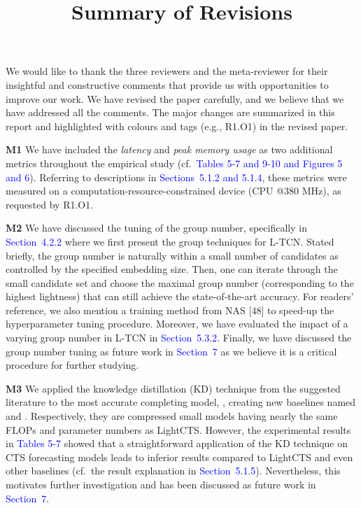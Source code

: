 \documentclass[sigconf,screen,anonymous=false]{acmart}
\newcommand{\LightCTS}{\mbox{LightCTS}}
\newcommand{\where}[1]{{\textcolor{blue}{#1}}}
\begin{document}
\pagestyle{plain}


\title{Summary of Revisions}
\maketitle

We would like to thank the three reviewers and the meta-reviewer for their insightful and constructive comments that provide us with opportunities to improve our work. We have revised the paper carefully, and we believe that we have addressed all the comments. The major changes are summarized in this report and highlighted with colours and tags (e.g., R1.O1) in the revised paper. 

\noindent
\textbf{M1}
\label{M1}
We have included the \emph{latency} and \emph{peak memory usage} as two additional metrics throughout the empirical study (cf.\ \where{Tables 5-7 and 9-10 and Figures 5 and 6}).
Referring to descriptions in \where{Sections~5.1.2 and 5.1.4}, these metrics were measured on a computation-resource-constrained device (CPU @380 MHz), as requested by R1.O1.



\noindent
\textbf{M2}
\label{M2}
We have discussed the tuning of the group number, specifically in \where{Section~4.2.2} where we first present the group techniques for L-TCN.
Stated briefly, the group number is naturally within a small number of candidates as controlled by the specified embedding size.
Then, one can iterate through the small candidate set and choose the maximal group number (corresponding to the highest lightness) that can still achieve the state-of-the-art accuracy.
For readers' reference, we also mention a training method from NAS [48] to speed-up the hyperparameter tuning procedure.
Moreover, we have evaluated the impact of a varying group number in L-TCN in \where{Section~5.3.2}.
Finally, we have discussed the group number tuning as future work in \where{Section~7} as we believe it is a critical procedure for further studying.





\noindent
\textbf{M3} 
\label{M3}
We applied the knowledge distillation (KD) technique from the suggested literature to the most accurate completing model, \AutoCTS{}, creating new baselines named \AutoCTSKDF{} and \AutoCTSKDP{}.
Respectively, they are compressed small models having nearly the same FLOPs and parameter numbers as \LightCTS{}.
However, the experimental results in \where{Tables 5-7} showed that a straightforward application of the KD technique on CTS forecasting models leads to inferior results compared to \LightCTS{} and even other baselines (cf.\ the result explanation in \where{Section~5.1.5}).
Nevertheless, this motivates further investigation and has been discussed as future work in \where{Section~7}.
\end{document}
